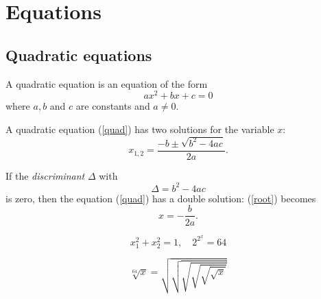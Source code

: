 \chapter{Equations}
\section{Quadratic equations}
\begin{dfn}
A quadratic equation is an equation of the form
\begin{equation}
  \label{quad}
  ax^2 + bx + c = 0
\end{equation}
where \( a, b \) and \( c \) are constants and \( a \neq 0 \).
\end{dfn}


\begin{thm}
A quadratic equation (\ref{quad}) has two solutions for the variable $x$:
\begin{equation}
  \label{root}
  x_{1, 2} = \frac{-b \pm \sqrt{b^2 - 4ac}}{2a}.
\end{equation}
\end{thm}
\begin{lem}
If the \emph{discriminant} $\Delta$ with
$$
\Delta = b^2 - 4 a c
$$
is zero, then the equation (\ref{quad}) has a double solution:
(\ref{root}) becomes
$$
x = -\frac{b}{2a}.
$$
\end{lem}

\begin{equation}
   x_1^2 + x_2^2 = 1, \quad 2^{2^x} = 64
\end{equation}

\begin{equation}
   \sqrt[64]{x} = \sqrt{\sqrt{\sqrt{\sqrt{\sqrt{\sqrt{x}}}}}}
\end{equation}